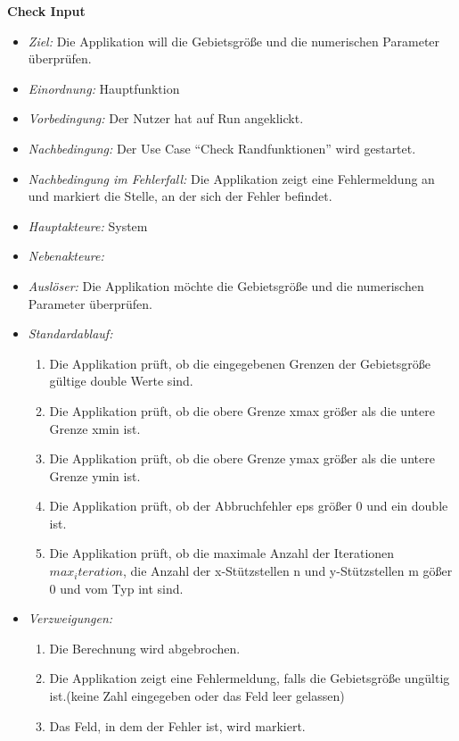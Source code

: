 \textbf{Check Input}
  \begin{itemize}
  \item \textit{Ziel:} Die Applikation will die Gebietsgr\"o\ss e und die numerischen Parameter \"uberpr\"ufen.
  \item \textit{Einordnung:} Hauptfunktion
  \item \textit{Vorbedingung:} Der Nutzer hat auf Run angeklickt.
  \item \textit{Nachbedingung:} Der Use Case "`Check Randfunktionen"' wird gestartet.
  \item \textit{Nachbedingung im Fehlerfall:} Die Applikation zeigt eine Fehlermeldung an und markiert die Stelle, an der sich der Fehler befindet.
  \item \textit{Hauptakteure:} System
  \item \textit{Nebenakteure:}
  \item \textit{Ausl\"oser:} Die Applikation m\"ochte die Gebietsgr\"o\ss e und die numerischen Parameter \"uberpr\"ufen.
  \item \textit{Standardablauf:}
    \begin{enumerate}
    \item Die Applikation pr\"uft, ob die eingegebenen Grenzen der Gebietsgr\"o\ss e g\"ultige double Werte sind.
    \item Die Applikation pr\"uft, ob die obere Grenze xmax gr\"o\ss er als die untere Grenze xmin ist.
    \item Die Applikation pr\"uft, ob die obere Grenze ymax gr\"o\ss er als die untere Grenze ymin ist.
    \item Die Applikation pr\"uft, ob der Abbruchfehler eps gr\"o\ss er 0 und ein double ist.
    \item Die Applikation pr\"uft, ob die maximale Anzahl der Iterationen $max_iteration$, die Anzahl der x-St\"utzstellen n und y-St\"utzstellen m   g\"o\ss er 0 und vom Typ int sind.
  \end{enumerate}
  \item \textit{Verzweigungen:}
    \begin{enumerate}[label=(1a\arabic*)]    
            \item Die Berechnung wird abgebrochen.
	\item Die Applikation zeigt eine Fehlermeldung, falls die Gebietsgr\"o\ss e ung\"ultig ist.(keine Zahl eingegeben oder das Feld leer gelassen)
	\item Das Feld, in dem der Fehler ist, wird markiert.
	\end{enumerate}

\end{itemize}
